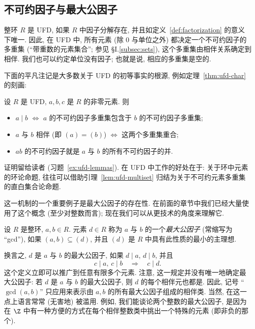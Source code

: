 \subsection{不可约因子与最大公因子}
\label{subsec:irreducible-gcd}

整环 $R$ 是 UFD, 如果 $R$ 中因子分解存在, 并且如定义~\ref{def:factorization} 的意义下唯一.
因此, 在 UFD 中, 所有元素 (除 $0$ 与单位之外) 都决定一个不可约因子的多重集
(``带重数的元素集合''; 参见 §I.\ref{subsec:sets}), 这个多重集由相伴关系确定到相伴.
我们也可以约定单位没有因子; 也就是说, 相应的多重集是空的.

\noindent 下面的平凡注记是大多数关于 UFD 的初等事实的根源, 例如定理~\ref{thm:ufd-char} 的刻画:

\begin{lemma}\label{lem:ufd-multiset}
设 $R$ 是 UFD, $a,b,c$ 是 $R$ 的非零元素. 则
\begin{itemize}
\item[(a)] $a\mid b$ $\iff$ $a$ 的不可约因子多重集包含于 $b$ 的不可约因子多重集;
\item[(b)] $a$ 与 $b$ 相伴 (即 $(a)=(b)$) $\iff$ 这两个多重集重合;
\item[(c)] $ab$ 的不可约因子就是 $a$ 与 $b$ 的所有不可约因子的并.
\end{itemize}
\end{lemma}

\noindent 证明留给读者 (习题~\ref{ex:ufd-lemmas}). 在 UFD 中工作的好处在于: 关于环中元素的环论命题,
往往可以借助引理~\ref{lem:ufd-multiset} 归结为关于不可约元素多重集的直白集合论命题.

\noindent 这一机制的一个重要例子是最大公因子的存在性. 在前面的章节中我们已经大量使用了这个概念
(至少对整数而言); 现在我们可以从更技术的角度来理解它.

\begin{definition}\label{def:gcd}
设 $R$ 是整环, $a,b\in R$. 元素 $d\in R$ 称为 $a$ 与 $b$ 的一个\emph{最大公因子} (常缩写为
``gcd''), 如果 $(a,b)\subseteq (d)$, 并且 $(d)$ 是 $R$ 中具有此性质的最小的主理想.
\end{definition}

\noindent 换言之, $d$ 是 $a$ 与 $b$ 的最大公因子, 如果 $d\mid a$, $d\mid b$, 并且
\[
c\mid a,\ c\mid b \quad\Longrightarrow\quad c\mid d.
\]
这个定义立即可以推广到任意有限多个元素. 注意, 这一规定并没有唯一地确定最大公因子:
若 $d$ 是 $a$ 与 $b$ 的最大公因子, 则 $d$ 的每个相伴元也都是. 因此, 记号 ``$\gcd(a,b)$''
只应用来表示由 $a,b$ 的所有最大公因子组成的相伴类. 当然, 在这一点上语言常常 (无害地) 被滥用.
例如, 我们能谈论两个整数的最大公因子, 是因为在 $\Z$ 中有一种方便的方式在每个相伴整数类中挑出一个特殊的元素
(即非负的那个).

